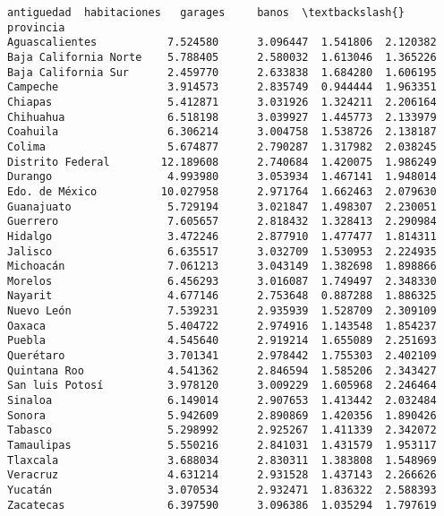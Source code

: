 \documentclass[11pt]{article}
\newcommand{\prompt}[4]{
        \llap{{\color{#2}[#3]: #4}}\vspace{-1.25em}
    }
\begin{document}
            \begin{tcolorbox}[breakable, boxrule=.5pt, size=fbox, pad at break*=1mm, opacityfill=0]
\prompt{Out}{outcolor}{7}{\hspace{3.5pt}}
\begin{Verbatim}[commandchars=\\\{\}]
                       antiguedad  habitaciones   garages     banos  \textbackslash{}
provincia
Aguascalientes           7.524580      3.096447  1.541806  2.120382
Baja California Norte    5.788405      2.580032  1.613046  1.365226
Baja California Sur      2.459770      2.633838  1.684280  1.606195
Campeche                 3.914573      2.835749  0.944444  1.963351
Chiapas                  5.412871      3.031926  1.324211  2.206164
Chihuahua                6.518198      3.039927  1.445773  2.133979
Coahuila                 6.306214      3.004758  1.538726  2.138187
Colima                   5.674877      2.790287  1.317982  2.038245
Distrito Federal        12.189608      2.740684  1.420075  1.986249
Durango                  4.993980      3.053934  1.467141  1.948014
Edo. de México          10.027958      2.971764  1.662463  2.079630
Guanajuato               5.729194      3.021847  1.498307  2.230051
Guerrero                 7.605657      2.818432  1.328413  2.290984
Hidalgo                  3.472246      2.877910  1.477477  1.814311
Jalisco                  6.635517      3.032709  1.530953  2.224935
Michoacán                7.061213      3.043149  1.382698  1.898866
Morelos                  6.456293      3.016087  1.749497  2.348330
Nayarit                  4.677146      2.753648  0.887288  1.886325
Nuevo León               7.539231      2.935939  1.528709  2.309109
Oaxaca                   5.404722      2.974916  1.143548  1.854237
Puebla                   4.545640      2.919214  1.655089  2.251693
Querétaro                3.701341      2.978442  1.755303  2.402109
Quintana Roo             4.541362      2.846594  1.585206  2.343427
San luis Potosí          3.978120      3.009229  1.605968  2.246464
Sinaloa                  6.149014      2.907653  1.413442  2.032484
Sonora                   5.942609      2.890869  1.420356  1.890426
Tabasco                  5.298992      2.925267  1.411339  2.342072
Tamaulipas               5.550216      2.841031  1.431579  1.953117
Tlaxcala                 3.688034      2.830311  1.383808  1.548969
Veracruz                 4.631214      2.931528  1.437143  2.266626
Yucatán                  3.070534      2.932471  1.836322  2.588393
Zacatecas                6.397590      3.096386  1.035294  1.797619


\end{Verbatim}
\end{tcolorbox}
\end{document}
